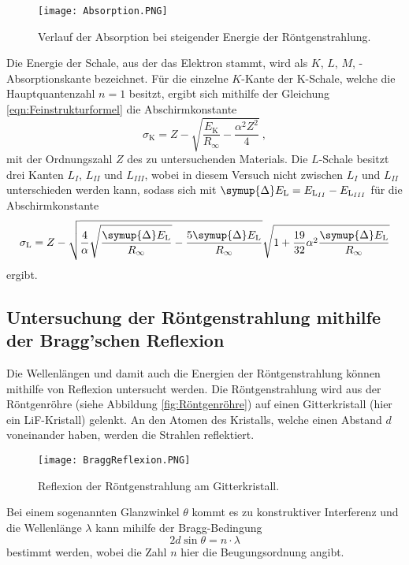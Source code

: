     \begin{figure}
        \centering
        \texttt{[image: Absorption.PNG]}
        \caption{Verlauf der Absorption bei steigender Energie der Röntgenstrahlung.}
        \label{fig:Absorption}
    \end{figure}
    
    Die Energie der Schale,
    aus der das Elektron stammt,
    wird als $K$, $L$, $M$, -Absorptionskante bezeichnet.
    Für die einzelne $K$-Kante der K-Schale,
    welche die Hauptquantenzahl $n=1$ besitzt,
    ergibt sich mithilfe der Gleichung \eqref{eqn:Feinstrukturformel} die Abschirmkonstante
    \begin{equation}
        \sigma_\text{K} = Z - \sqrt{\frac{E_\text{K}}{R_\infty} - \frac{\alpha^2 Z^2}{4}} \ ,
        \label{eqn:SigmaK}
    \end{equation}
    mit der Ordnungszahl $Z$ des zu untersuchenden Materials.
    Die $L$-Schale besitzt drei Kanten $L_I$, $L_{II}$ und $L_{III}$,
    wobei in diesem Versuch nicht zwischen $L_I$ und $L_{II}$ unterschieden werden kann,
    sodass sich mit $\symup{\Delta} E_\text{L} = E_{\text{L}_{II}} - E_{\text{L}_{III}}$ für die Abschirmkonstante
    \begin{equation}
        \sigma_\text{L} = Z - \sqrt{\frac{4}{\alpha} 
        \sqrt{\frac{\symup{\Delta}E_\text{L}}{R_\infty}} - \frac{5\symup{\Delta}E_\text{L}}{R_\infty}} 
        \sqrt{1 + \frac{19}{32}\alpha^2 \frac{\symup{\Delta}E_\text{L}}{R_\infty}}  
    \end{equation}
    ergibt.

\subsection{Untersuchung der Röntgenstrahlung mithilfe der Bragg'schen Reflexion}

    Die Wellenlängen und damit auch die Energien der Röntgenstrahlung können mithilfe von Reflexion untersucht werden.
    Die Röntgenstrahlung wird aus der Röntgenröhre (siehe Abbildung \ref{fig:Röntgenröhre}) auf einen Gitterkristall (hier ein LiF-Kristall) gelenkt.
    An den Atomen des Kristalls,
    welche einen Abstand $d$ voneinander haben,
    werden die Strahlen reflektiert.
    \begin{figure}
        \centering
        \texttt{[image: BraggReflexion.PNG]}
        \caption{Reflexion der Röntgenstrahlung am Gitterkristall.}
        \label{fig:BraggReflexion}
    \end{figure}
    
    Bei einem sogenannten Glanzwinkel $\theta$ kommt es zu konstruktiver Interferenz und die Wellenlänge $\lambda$ kann mihilfe der Bragg-Bedingung
    \begin{equation}
        2 d \sin{\theta} = n \cdot \lambda
        \label{eqn:BraggBedingung}
    \end{equation}
    bestimmt werden,
    wobei die Zahl $n$ hier die Beugungsordnung angibt.

    
    



